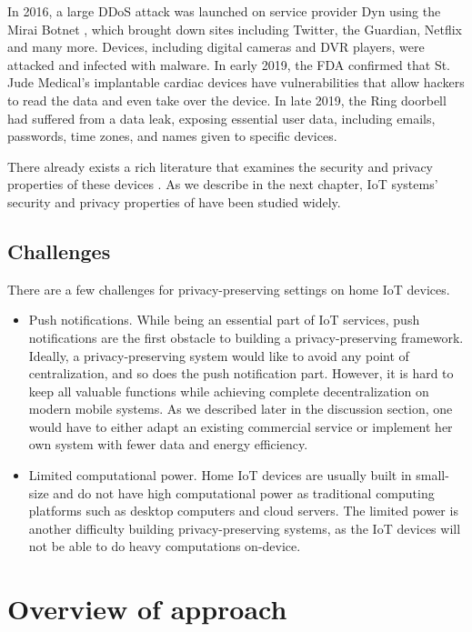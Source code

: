 In 2016, a large DDoS attack was launched on service provider Dyn using the Mirai Botnet \cite{antonakakis2017understanding}, which brought down sites including Twitter, the Guardian, Netflix and many more. Devices, including digital cameras and DVR players, were attacked and infected with malware. In early 2019, the FDA confirmed that St. Jude Medical's implantable cardiac devices have vulnerabilities that allow hackers to read the data and even take over the device. In late 2019, the Ring doorbell had suffered from a data leak, exposing essential user data, including emails, passwords, time zones, and names given to specific devices.

There already exists a rich literature that examines the security and privacy properties of these devices \cite{acar2016sok} \cite{hilt2019internet} \cite{shumailov2019hearing} \cite{apthorpe2017smart}. As we describe in the next chapter, IoT systems' security and privacy properties of have been studied widely.


\subsection{Challenges}

There are a few challenges for privacy-preserving settings on home IoT devices. 

\begin{itemize}
	\item Push notifications. While being an essential part of IoT services, push notifications are the first obstacle to building a privacy-preserving framework. Ideally, a privacy-preserving system would like to avoid any point of centralization, and so does the push notification part. However, it is hard to keep all valuable functions while achieving complete decentralization on modern mobile systems. As we described later in the discussion section, one would have to either adapt an existing commercial service or implement her own system with fewer data and energy efficiency.
	\item Limited computational power. Home IoT devices are usually built in small-size and do not have high computational power as traditional computing platforms such as desktop computers and cloud servers. The limited power is another difficulty building privacy-preserving systems, as the IoT devices will not be able to do heavy computations on-device.
\end{itemize}

\section{Overview of approach}

